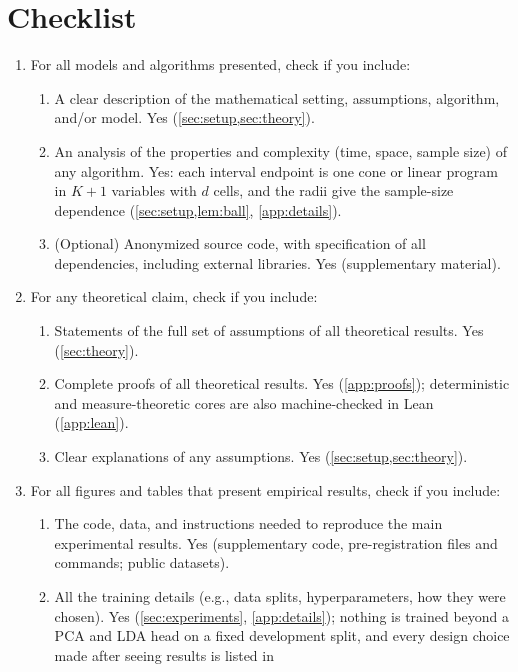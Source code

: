 \section*{Checklist}

\begin{enumerate}
  \item For all models and algorithms presented, check if you include:
  \begin{enumerate}
    \item A clear description of the mathematical setting, assumptions, algorithm, and/or model. Yes
    (\cref{sec:setup,sec:theory}).
    \item An analysis of the properties and complexity (time, space, sample size) of any algorithm. Yes:
    each interval endpoint is one cone or linear program in $K+1$ variables with $d$ cells, and the radii
    give the sample-size dependence (\cref{sec:setup,lem:ball}, \cref{app:details}).
    \item (Optional) Anonymized source code, with specification of all dependencies, including external
    libraries. Yes (supplementary material).
  \end{enumerate}
  \item For any theoretical claim, check if you include:
  \begin{enumerate}
    \item Statements of the full set of assumptions of all theoretical results. Yes (\cref{sec:theory}).
    \item Complete proofs of all theoretical results. Yes (\cref{app:proofs}); deterministic and
    measure-theoretic cores are also machine-checked in Lean (\cref{app:lean}).
    \item Clear explanations of any assumptions. Yes (\cref{sec:setup,sec:theory}).
  \end{enumerate}
  \item For all figures and tables that present empirical results, check if you include:
  \begin{enumerate}
    \item The code, data, and instructions needed to reproduce the main experimental results. Yes
    (supplementary code, pre-registration files and commands; public datasets).
    \item All the training details (e.g., data splits, hyperparameters, how they were chosen). Yes
    (\cref{sec:experiments}, \cref{app:details}); nothing is trained beyond a PCA and LDA head on a fixed
    development split, and every design choice made after seeing results is listed in

\end{enumerate}
\end{enumerate}
